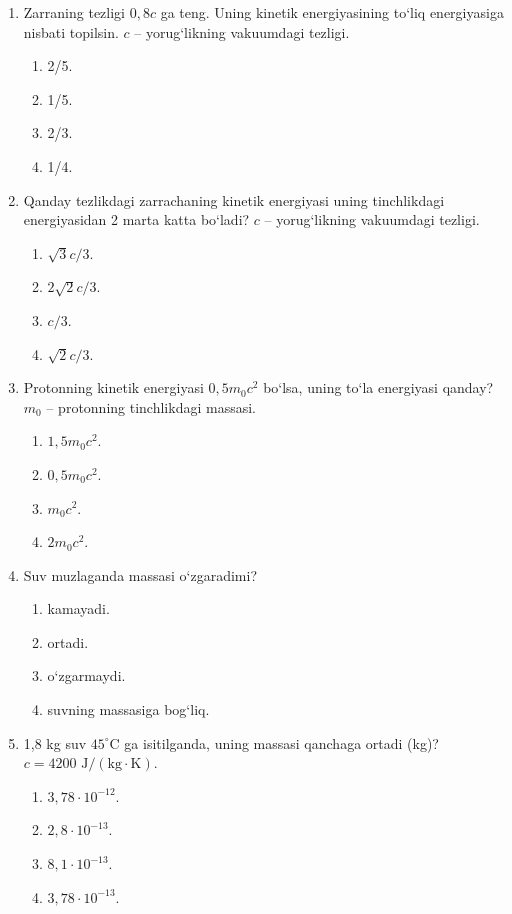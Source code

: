 \begin{enumerate}
\item Zarraning tezligi $0,8c$ ga teng. Uning kinetik energiyasining to‘liq energiyasiga nisbati topilsin. $c$ -- yorug‘likning vakuumdagi tezligi.
\begin{enumerate}[label=\Alph*)]
\item 2/5.
\item 1/5.
\item 2/3.
\item 1/4.
\end{enumerate}

\item Qanday tezlikdagi zarrachaning kinetik energiyasi uning tinchlikdagi energiyasidan 2 marta katta bo‘ladi? $c$ -- yorug‘likning vakuumdagi tezligi.
\begin{enumerate}[label=\Alph*)]
\item $\sqrt{3}c/3$.
\item $2\sqrt{2}c/3$.
\item $c/3$.
\item $\sqrt{2}c/3$.
\end{enumerate}

\item Protonning kinetik energiyasi $0,5m_0c^2$ bo‘lsa, uning to‘la energiyasi qanday? $m_0$ -- protonning tinchlikdagi massasi.
\begin{enumerate}[label=\Alph*)]
\item $1,5m_0c^2$.
\item $0,5m_0c^2$.
\item $m_0c^2$.
\item $2m_0c^2$.
\end{enumerate}


\item Suv muzlaganda massasi o‘zgaradimi?
\begin{enumerate}[label=\Alph*)]
\item kamayadi.
\item ortadi.
\item o‘zgarmaydi.
\item suvning massasiga bog‘liq.
\end{enumerate}

\item 1,8 kg suv $45^\circ\text{C}$ ga isitilganda, uning massasi qanchaga ortadi (kg)? $c=4200\text{ J}/(\text{kg}\cdot\text{K})$.
\begin{enumerate}[label=\Alph*)]
\item $3,78\cdot 10^{-12}$.
\item $2,8\cdot 10^{-13}$.
\item $8,1\cdot 10^{-13}$.
\item $3,78\cdot 10^{-13}$.
\end{enumerate}


\end{enumerate}
